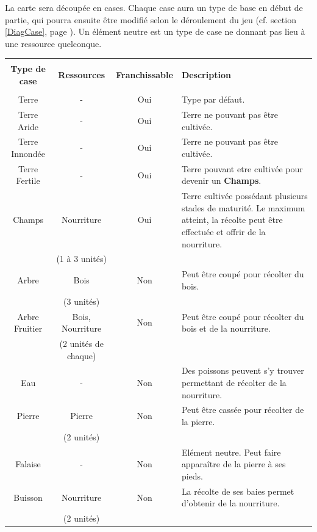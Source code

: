 \documentclass[a4paper]{article}
\newcommand{\alinea}{\hspace*{0.5cm}}
\begin{document}
          \alinea La carte sera découpée en cases. Chaque case aura un type de base en début de partie, qui pourra ensuite être modifié selon le déroulement du jeu (cf. section \ref{DiagCase}, page \pageref{DiagCase}). Un élément neutre est un type de case ne donnant pas lieu à une ressource quelconque.\\
          \newline
          \label{TabCase}
          \begin{small}
            \begin{tabular}{| c | c | c |p{5cm}|}
              \hline
              &  &  &  \\
              \textbf{Type de case} & \textbf{Ressources} & \textbf{Franchissable} & \textbf{Description}\\
              &  &  &  \\
              \hline
              Terre & - & Oui & Type par défaut.\\
              \hline
              Terre Aride & - & Oui & Terre ne pouvant pas être cultivée.\\
              \hline
              Terre Innondée & - & Oui & Terre ne pouvant pas être cultivée.\\
              \hline
              Terre Fertile & - & Oui & Terre pouvant etre cultivée pour devenir un \textbf{Champs}.\\
              \hline
              Champs & Nourriture & Oui & Terre cultivée possédant plusieurs stades de maturité. Le maximum atteint, la récolte peut être effectuée et offrir de la nourriture.\\
              & (1 à 3 unités) &  &  \\
              \hline
              Arbre & Bois & Non & Peut être coupé pour récolter du bois.\\
              & (3 unités) &  &  \\
              \hline
              Arbre Fruitier & Bois, Nourriture & Non & Peut être coupé pour récolter du bois et de la nourriture.\\
              & (2 unités de chaque) &  &  \\
              \hline
              Eau & - & Non & Des poissons peuvent s'y trouver permettant de récolter de la nourriture.\\
              \hline
              Pierre & Pierre & Non & Peut être cassée pour récolter de la pierre.\\
              & (2 unités) &  &  \\
              \hline
              Falaise & - & Non & Elément neutre. Peut faire apparaître de la pierre à ses pieds.\\
              \hline
              Buisson & Nourriture & Non & La récolte de ses baies permet d'obtenir de la nourriture.\\
              & (2 unités) &  &  \\
              \hline
            \end{tabular}
          \end{small}
    
\end{document}
